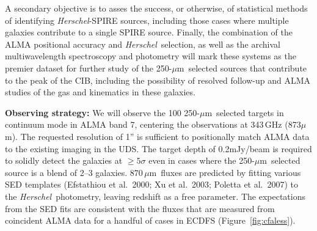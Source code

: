 \documentclass[11pt,a4paper]{article}
\newcommand{\herschel}{{\it Herschel}}
\newcommand{\micron}{$\mu$m}
\begin{document}
A secondary objective is to asses the
success, or otherwise, of statistical methods of identifying
\herschel-SPIRE sources, including those cases where multiple galaxies
contribute to a single SPIRE source. Finally, the combination of the
ALMA positional accuracy and \herschel\ selection, as well as the
archival multiwavelength spectroscopy and photometry will mark these
systems as the premier dataset for further study of the 250-\micron\ selected
sources that contribute to the peak of the CIB, including the
possibility of resolved follow-up and ALMA studies of the gas and kinematics in
these galaxies. 




\vspace{0.3cm}
{\bf Observing strategy:}
%
We will observe the 100 250-\micron\ selected targets in continuum
mode in ALMA band 7, centering the observations at 343\,GHz
(873\micron). 
%
The requested resolution of 1'' is sufficient to positionally match
ALMA data to the existing imaging in the UDS. The target depth of 0.2mJy/beam
is required to solidly detect the galaxies at $\ge5\sigma$ even in
cases where the 250-\micron\ selected source is a blend of 2--3
galaxies. 870\,\micron\ fluxes are predicted  by fitting various SED
templates (Efstathiou et al.\ 2000; Xu et al.\
2003; Poletta et al.\ 2007) to the \herschel\ photometry, leaving
redshift as a free parameter. The expectations from the SED fits are
consistent with the fluxes that are measured from coincident ALMA data for a handful of cases
in ECDFS (Figure~\ref{fig:cfaless}).
\end{document}
